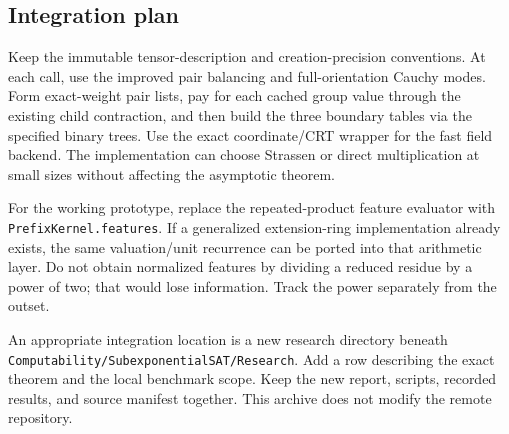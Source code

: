 \documentclass[11pt,letterpaper]{article}
\theoremstyle{definition}\newtheorem{definition}[theorem]{Definition}
\theoremstyle{remark}\newtheorem{remark}[theorem]{Remark}
\begin{document}
\subsection{Integration plan}
Keep the immutable tensor-description and creation-precision conventions. At each call,
use the improved pair balancing and full-orientation Cauchy modes. Form exact-weight
pair lists, pay for each cached group value through the existing child contraction, and
then build the three boundary tables via the specified binary trees. Use the exact
coordinate/CRT wrapper for the fast field backend. The implementation can choose
Strassen or direct multiplication at small sizes without affecting the asymptotic theorem.

For the working prototype, replace the repeated-product feature evaluator with
\nolinkurl{PrefixKernel.features}. If a generalized extension-ring implementation already
exists, the same valuation/unit recurrence can be ported into that arithmetic layer.
Do not obtain normalized features by dividing a reduced residue by a power of two;
that would lose information. Track the power separately from the outset.

An appropriate integration location is a new research directory beneath
\nolinkurl{Computability/SubexponentialSAT/Research}. Add a row describing the exact theorem
and the local benchmark scope. Keep the new report, scripts, recorded results, and
source manifest together. This archive does not modify the remote repository.
\end{document}
